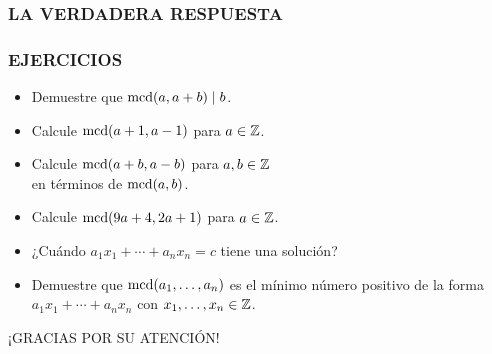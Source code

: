 \begin{frame}
  \frametitle{LA VERDADERA RESPUESTA}



\end{frame}


\begin{frame}
  \frametitle{EJERCICIOS}

  \begin{itemize}
  \item<2-> Demuestre que $\operatorname{mcd} (a, a+b) \mid b$.

  \item<3-> Calcule $\operatorname{mcd} (a+1, a-1)$ para $a \in \mathbb{Z}$.

  \item<4-> Calcule $\operatorname{mcd} (a+b, a-b)$ para $a,b \in \mathbb{Z}$ \\
    en términos de $\operatorname{mcd}(a,b)$.

  \item<5-> Calcule $\operatorname{mcd} (9a+4, 2a+1)$ para $a \in \mathbb{Z}$.

  \item<6-> ¿Cuándo $a_1 x_1 + \cdots + a_n x_n = c$ tiene una solución?

  \item<7-> Demuestre que $\operatorname{mcd} (a_1,\ldots,a_n)$ es el mínimo número positivo
    de la forma $a_1 x_1 + \cdots + a_n x_n$ con $x_1, \ldots, x_n \in \mathbb{Z}$.
  \end{itemize}
\end{frame}

\begin{frame}

  \vfill

  \begin{center}\huge\headingfont
    ¡GRACIAS POR SU ATENCIÓN!
  \end{center}

  \vfill
\end{frame}

